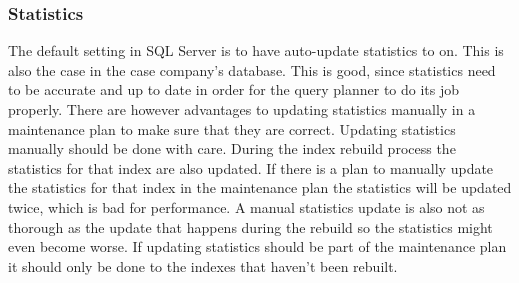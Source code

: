 \documentclass{cslthse-msc}
\begin{document}
\subsubsection{Statistics}
The default setting in SQL Server is to have auto-update statistics to on. This is also the case in the case company's database. This is good, since statistics need to be accurate and up to date in order for the query planner to do its job properly. There are however advantages to updating statistics manually in a maintenance plan to make sure that they are correct. Updating statistics manually should be done with care. During the index rebuild process the statistics for that index are also updated. If there is a plan to manually update the statistics for that index in the maintenance plan the statistics will be updated twice, which is bad for performance. A manual statistics update is also not as thorough as the update that happens during the rebuild so the statistics might even become worse. If updating statistics should be part of the maintenance plan it should only be done to the indexes that haven't been rebuilt.
\end{document}
